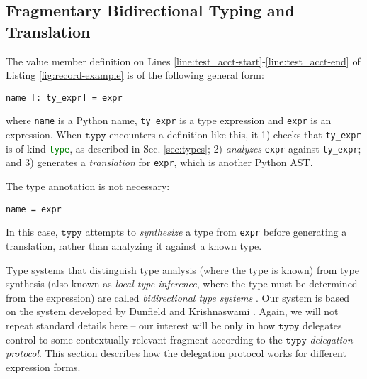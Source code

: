 \documentclass[preprint,10pt]{sigplanconf}
\newcommand{\typy}{\texttt{typy}}
\newcommand{\lip}[1]{\lstinline[language=Python,basicstyle=\ttfamily\footnotesize,deletendkeywords={tuple,buffer,map}]{#1}}
\newcommand{\li}[1]{\lip{#1}}
\begin{document}
\subsection{Fragmentary Bidirectional Typing and Translation}\label{sec:typechecking-and-translation}
The value member definition on Lines \ref{line:test_acct-start}-\ref{line:test_acct-end} of Listing \ref{fig:record-example} is of the following general form:
\begin{lstlisting}[numbers=none]
name [: ty_expr] = expr
\end{lstlisting}
where \lip{name} is a Python name, \lip{ty_expr} is a type expression and \lip{expr} is an expression. When $\typy$ encounters a definition like this, it 1) checks that \lip{ty_expr} is of kind \li{type}, as described in Sec. \ref{sec:types}; 2) \emph{analyzes} \lip{expr} against \lip{ty_expr}; and 3) generates a \emph{translation} for \lip{expr}, which is another Python AST.%

The type annotation is not necessary:%
\begin{lstlisting}[numbers=none]
name = expr
\end{lstlisting}
In this case, $\typy$ attempts to \emph{synthesize} a type from \lip{expr} before generating a translation, rather than analyzing it against a known type. 

Type systems that distinguish type analysis (where the type is known) from type synthesis (also known as \emph{local type inference}, where the type must be determined from the expression) are called \emph{bidirectional type systems} \cite{Pierce:2000:LTI:345099.345100}. Our system is based on the system developed by Dunfield and Krishnaswami \cite{conf/icfp/DunfieldK13}. Again, we will not repeat standard details here -- our interest will be only in how $\typy$ delegates control  to some contextually relevant fragment according to the $\typy$ \emph{delegation protocol}. This section describes how the delegation protocol works for different expression forms.


\vspace{-3px}
\end{document}
